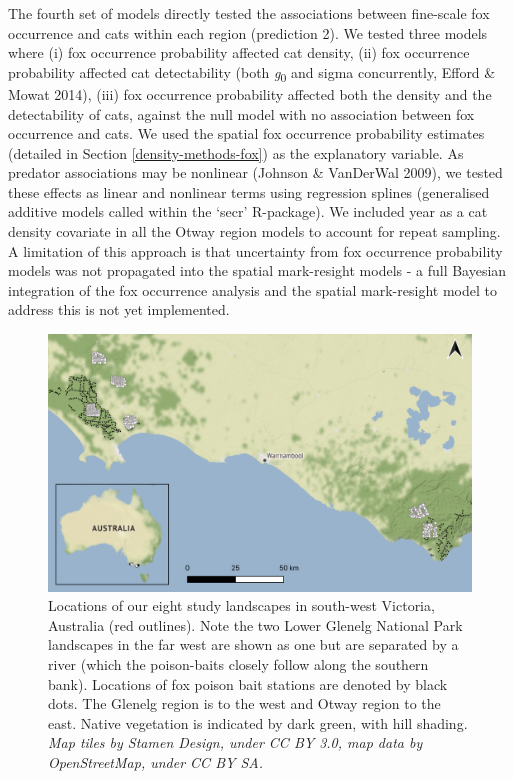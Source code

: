\documentclass[preprint, 3p, authoryear]{elsarticle} %
\begin{document}
The fourth set of models directly tested the associations between fine-scale fox occurrence and cats within each region (prediction 2). We tested three models where (i) fox occurrence probability affected cat density, (ii) fox occurrence probability affected cat detectability (both \emph{g}\textsubscript{0} and sigma concurrently, Efford \& Mowat 2014), (iii) fox occurrence probability affected both the density and the detectability of cats, against the null model with no association between fox occurrence and cats. We used the spatial fox occurrence probability estimates (detailed in Section \ref{density-methods-fox}) as the explanatory variable. As predator associations may be nonlinear (Johnson \& VanDerWal 2009), we tested these effects as linear and nonlinear terms using regression splines (generalised additive models called within the `secr' R-package). We included year as a cat density covariate in all the Otway region models to account for repeat sampling. A limitation of this approach is that uncertainty from fox occurrence probability models was not propagated into the spatial mark-resight models - a full Bayesian integration of the fox occurrence analysis and the spatial mark-resight model to address this is not yet implemented.

\newpage

\begin{figure}

{\centering \includegraphics[width=1\linewidth]{../figs/fig1} 

}

\caption{Locations of our eight study landscapes in south-west Victoria, Australia (red outlines). Note the two Lower Glenelg National Park landscapes in the far west are shown as one but are separated by a river (which the poison-baits closely follow along the southern bank). Locations of fox poison bait stations are denoted by black dots. The Glenelg region is to the west and Otway region to the east. Native vegetation is indicated by dark green, with hill shading. \textit{Map tiles by Stamen Design, under CC BY 3.0, map data by OpenStreetMap, under CC BY SA.}}\label{fig:density-map}
\end{figure}
\end{document}
